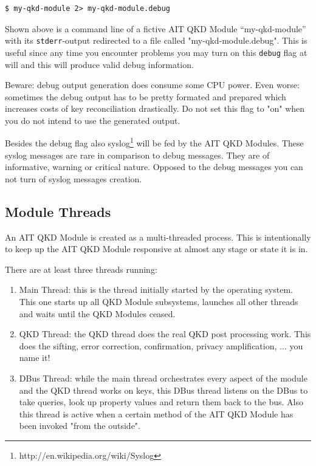 \begin{minipage}{0.9\textwidth}
\bigskip
\begin{verbatim}
$ my-qkd-module 2> my-qkd-module.debug
\end{verbatim}
\medskip
\end{minipage}

Shown above is a command line of a fictive AIT QKD Module ``my-qkd-module'' with its \texttt{stderr}-output redirected to a file called "my-qkd-module.debug". This is useful since any time you encounter problems you may turn on this \texttt{debug} flag at will and this will produce valid debug information.

\medskip

Beware: debug output generation does consume some CPU power. Even worse: sometimes the debug output has to be pretty formated and prepared which increases costs of key reconciliation drastically. Do not set this flag to "on" when you do not intend to use the generated output.

\medskip

Besides the debug flag also syslog\footnote{http://en.wikipedia.org/wiki/Syslog} will be fed by the AIT QKD Modules. These syslog messages are rare in comparison to debug messages. They are of informative, warning or critical nature. Opposed to the debug messages you can not turn of syslog messages creation.    

\subsection{Module Threads}
\label{subsec:Module Threads}

An AIT QKD Module is created as a multi-threaded process. This is intentionally to keep up the AIT QKD Module responsive at almost any stage or state it is in.

\medskip

There are at least three threads running:

\begin{enumerate}

\item{Main Thread}: this is the thread initially started by the operating system. This one starts up all QKD Module subsystems, launches all other threads and waits until the QKD Modules ceased.

\item{QKD Thread}: the QKD thread does the real QKD post processing work. This does the sifting, error correction, confirmation, privacy amplification, ... you name it!

\item{DBus Thread}: while the main thread orchestrates every aspect of the module and the QKD thread works on keys, this DBus thread listens on the DBus to take queries, look up property values and return them back to the bus. Also this thread is active when a certain method of the AIT QKD Module has been invoked "from the outside".

\end{enumerate}

